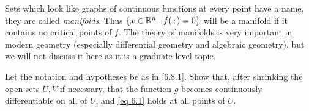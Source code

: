 \begin{rmk}\label{6.8.4}
  Sets which look like graphs of continuous functions at every point have a name, they are called \emph{manifolds}.
  Thus \(\{x \in \mathbb{R}^n : f(x) = 0\}\) will be a manifold if it contains no critical points of \(f\).
  The theory of manifolds is very important in modern geometry (especially differential geometry and algebraic geometry), but we will not discuss it here as it is a graduate level topic.
\end{rmk}

\exercisesection

\begin{ex}\label{ex:6.8.1}
  Let the notation and hypotheses be as in \cref{6.8.1}.
  Show that, after shrinking the open sets \(U, V\) if necessary, that the function \(g\) becomes continuously differentiable on all of \(U\), and \cref{eq 6.1} holds at all points of \(U\).
\end{ex}